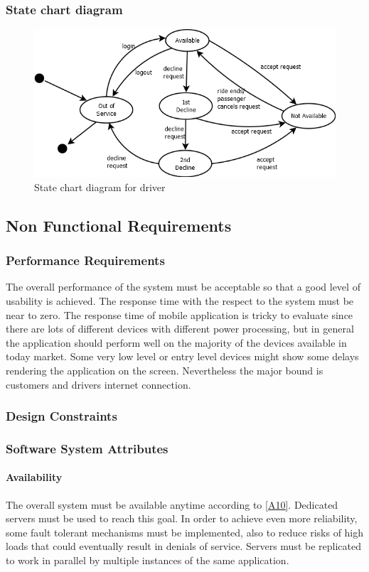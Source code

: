 \documentclass[a4paper,12pt,dvipsnames]{article}%
\begin{document}
\subsubsection{State chart diagram}
\begin{figure}[H]
\centering
\includegraphics[scale=.7]{state_chart_driver.png}
\caption{State chart diagram for driver}
\end{figure}
\break
\subsection{Non Functional Requirements}
\subsubsection{Performance Requirements}
The overall performance of the system must be acceptable so that a good level of usability is achieved.
The response time with the respect to the system must be near to zero. The response time of mobile application is tricky to evaluate since there are lots of different devices with different power processing, but  in general the application should perform well on the majority of the devices available in today market. Some very low level or entry level devices might show some delays rendering the application on the screen. Nevertheless the major bound is customers and drivers internet connection. 
\subsubsection{Design Constraints}
\subsubsection{Software System Attributes}
\paragraph{Availability} The overall system must be available anytime according to \hyperref[a10]{[A10]}. Dedicated servers must be used to reach this goal. In order to achieve even more reliability, some fault tolerant mechanisms must be implemented, also to reduce risks of high loads that could eventually result in denials of service. Servers must be replicated to work in parallel by multiple instances of the same application. 
\end{document}
